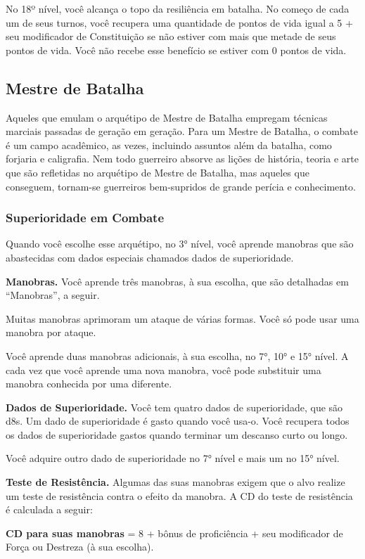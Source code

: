 \documentclass{RPG_Adventure}[2021/10/20]
\begin{document}
No 18º nível, você alcança o topo da resiliência em batalha. No começo de cada
um de seus turnos, você recupera uma quantidade de pontos de vida igual a 5 +
seu modificador de Constituição se não estiver com mais que metade de seus
pontos de vida. Você não recebe esse benefício se estiver com 0 pontos de vida.

\subsection*{Mestre de Batalha}%
\label{sub:mestre_de_batalha}

Aqueles que emulam o arquétipo de Mestre de Batalha empregam técnicas marciais
passadas de geração em geração. Para um Mestre de Batalha, o combate é um campo
acadêmico, as vezes, incluindo assuntos além da batalha, como forjaria e
caligrafia. Nem todo guerreiro absorve as lições de história, teoria e arte que
são refletidas no arquétipo de Mestre de Batalha, mas aqueles que conseguem,
tornam-se guerreiros bem-supridos de grande perícia e conhecimento.

\subsubsection{Superioridade em Combate}%

Quando você escolhe esse arquétipo, no 3° nível, você aprende manobras que são
abastecidas com dados especiais chamados dados de superioridade.

\textbf{Manobras.} Você aprende três manobras, à sua escolha, que são detalhadas
em ``Manobras'', a seguir.

Muitas manobras aprimoram um ataque de várias formas.  Você só pode usar uma
manobra por ataque.

Você aprende duas manobras adicionais, à sua escolha, no 7°, 10° e 15° nível. A
cada vez que você aprende uma nova manobra, você pode substituir uma manobra
conhecida por uma diferente.

\textbf{Dados de Superioridade.} Você tem quatro dados de superioridade, que são
d8s. Um dado de superioridade é gasto quando você usa-o. Você recupera todos os
dados de superioridade gastos quando terminar um descanso curto ou longo.

Você adquire outro dado de superioridade no 7° nível e mais um no 15° nível.

\textbf{Teste de Resistência.} Algumas das suas manobras exigem que o alvo
realize um teste de resistência contra o efeito da manobra. A CD do teste de
resistência é calculada a seguir:
\begin{center}
\textbf{CD para suas manobras} = 8 + bônus de proficiência + seu modificador de
Força ou Destreza (à sua escolha).
\end{center}
\end{document}
